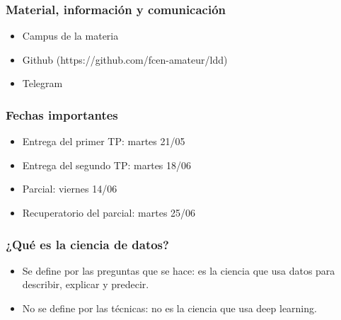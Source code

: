 \documentclass[aspectratio=169,12pt]{beamer}
\begin{document}

\begin{frame}
\frametitle{Material, información y comunicación}

\begin{itemize}
\item Campus de la materia
\item Github (https://github.com/fcen-amateur/ldd)
\item Telegram
\end{itemize}
\end{frame}


\begin{frame}
\frametitle{Fechas importantes}

\begin{itemize}
\item Entrega del primer TP: martes 21/05
\item Entrega del segundo TP: martes 18/06
\item Parcial: viernes 14/06
\item Recuperatorio del parcial: martes 25/06
\end{itemize}

\end{frame}


\begin{frame}
\frametitle{¿Qué es la ciencia de datos?}

\begin{itemize}
\item Se define por las preguntas que se hace: es la ciencia que usa datos para describir, explicar y predecir.
\item No se define por las técnicas: no es la ciencia que usa deep learning.
\end{itemize}

\end{frame}

\end{document}
